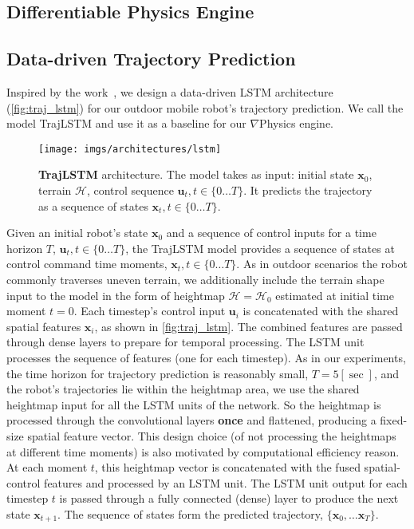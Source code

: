 \subsection{Differentiable Physics Engine}\label{subsec:dphysics}


\subsection{Data-driven Trajectory Prediction}\label{subsec:data_driven_baseline}
Inspired by the work~\cite{pang2019aircraft}, we design a data-driven LSTM architecture (\autoref{fig:traj_lstm}) for our outdoor mobile robot's trajectory prediction.
We call the model TrajLSTM and use it as a baseline for our $\nabla$Physics engine.
\begin{figure}
    \centering
    \texttt{[image: imgs/architectures/lstm]}
    \caption{\textbf{TrajLSTM} architecture. The model takes as input: initial state $\mathbf{x}_0$, terrain $\mathcal{H}$, control sequence $\mathbf{u}_t, t \in \{0 \dots T\}$. It predicts the trajectory as a sequence of states $\mathbf{x}_t, t \in \{0 \dots T\}.$}
    \label{fig:traj_lstm}
\end{figure}
Given an initial robot's state $\mathbf{x}_0$ and a sequence of control inputs for a time horizon $T$, $\mathbf{u}_t, t \in \{0 \dots T\}$, the TrajLSTM model provides a sequence of states at control command time moments, $\mathbf{x}_t, t \in \{0 \dots T\}$.
As in outdoor scenarios the robot commonly traverses uneven terrain, we additionally include the terrain shape input to the model in the form of heightmap $\mathcal{H}=\mathcal{H}_0$ estimated at initial time moment $t=0$.
Each timestep's control input $\mathbf{u}_i$ is concatenated with the shared spatial features $\mathbf{x}_i$, as shown in \autoref{fig:traj_lstm}.
The combined features are passed through dense layers to prepare for temporal processing.
The LSTM unit~\cite{hochreiter1997long} processes the sequence of features (one for each timestep).
As in our experiments, the time horizon for trajectory prediction is reasonably small, $T=5 [\si{\sec}]$, and the robot's trajectories lie within the heightmap area, we use the shared heightmap input for all the LSTM units of the network.
So the heightmap is processed through the convolutional layers \textbf{once} and flattened, producing a fixed-size spatial feature vector.
This design choice (of not processing the heightmaps at different time moments) is also motivated by computational efficiency reason.
At each moment $t$, this heightmap vector is concatenated with the fused spatial-control features and processed by an LSTM unit.
The LSTM unit output for each timestep $t$ is passed through a fully connected (dense) layer to produce the next state $\mathbf{x}_{t+1}$.
The sequence of states form the predicted trajectory, $\{\mathbf{x}_0, \dots \mathbf{x}_T\}$.


